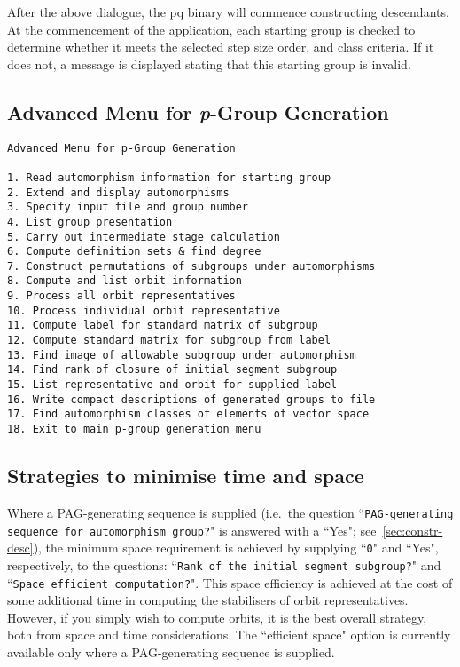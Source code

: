 \documentclass[12pt]{article}
\begin{document}
After the above dialogue, the pq binary will commence constructing
descendants. At the commencement of the application, each starting group
is checked to determine whether it meets the selected step size
order, and class criteria. If it does not, a message is displayed 
stating that this starting group is invalid. 

\subsection{Advanced Menu for {\it p}-Group Generation}
\label{sec:pgrp-gen-advanced-menu}
\begin{verbatim}
Advanced Menu for p-Group Generation
-------------------------------------
1. Read automorphism information for starting group
2. Extend and display automorphisms
3. Specify input file and group number
4. List group presentation
5. Carry out intermediate stage calculation
6. Compute definition sets & find degree
7. Construct permutations of subgroups under automorphisms
8. Compute and list orbit information
9. Process all orbit representatives
10. Process individual orbit representative
11. Compute label for standard matrix of subgroup
12. Compute standard matrix for subgroup from label
13. Find image of allowable subgroup under automorphism
14. Find rank of closure of initial segment subgroup
15. List representative and orbit for supplied label
16. Write compact descriptions of generated groups to file
17. Find automorphism classes of elements of vector space
18. Exit to main p-group generation menu
\end{verbatim}

\subsection{Strategies to minimise time and space}\label{sec:min-time-space}
Where a PAG-generating sequence is supplied (i.e.\ the question 
``\texttt{PAG-generating sequence for automorphism group?}" is answered with
a ``Yes"; see~\ref{sec:constr-desc}), the minimum space 
requirement is achieved by supplying ``\texttt{0}" and ``Yes",
respectively, to the questions:
``\texttt{Rank of the initial segment subgroup?}" and 
``\texttt{Space efficient computation?}".
This space efficiency is achieved at the cost of some additional
time in computing the stabilisers of orbit representatives.
However, if you simply wish to compute orbits, it is the 
best overall strategy, both from space and time considerations.
The ``efficient space" option is currently available only 
where a PAG-generating sequence is supplied. 
\end{document}
